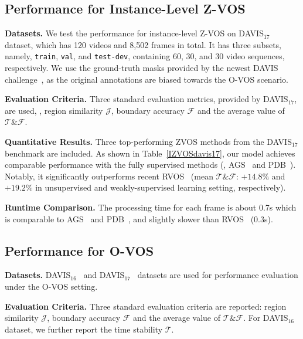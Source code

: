 \documentclass[10pt,twocolumn,letterpaper]{article}
\begin{document}
\vspace{-2pt}
\subsection{Performance for Instance-Level Z-VOS}
\label{sec:IZVOS}
\vspace{-1pt}
\noindent\textbf{Datasets.} We test the performance for instance-level Z-VOS on DAVIS$_{17}$~\!\cite{Caelles_arXiv_2019} dataset, which has 120 videos and 8,502 frames in total. It has three subsets, namely, \texttt{train},
\texttt{val}, and \texttt{test-dev}, containing 60, 30, and 30 video sequences, respectively. We use the ground-truth masks provided by the newest DAVIS challenge~\!\cite{Caelles_arXiv_2019}, as the original annotations are biased towards the O-VOS scenario.

\noindent\textbf{Evaluation Criteria.}
Three standard evaluation metrics, provided by DAVIS$_{17}$, are used, \ie, region similarity $\mathcal{J}$, boundary accuracy $\mathcal{F}$ and the average value of $\mathcal{T}\&\mathcal{F}$.

\noindent\textbf{Quantitative Results.} Three top-performing ZVOS methods from the DAVIS$_{17}$ benchmark are included. As shown in Table~\!\ref{IZVOSdavis17},  our model achieves comparable performance with the fully supervised methods (\ie, AGS~\!\cite{wang2019learning} and PDB~\!\cite{Song_2018_ECCV}). Notably, it significantly outperforms recent RVOS~\!\cite{ventura2019rvos}  (mean $\mathcal{T}\&\mathcal{F}$: $+14.8\%$ and $+19.2\%$ in unsupervised and weakly-supervised learning setting, respectively).



\noindent\textbf{Runtime Comparison.} The processing time for each frame is about 0.7s which is comparable to AGS~\!\cite{wang2019learning} and PDB~\!\cite{Song_2018_ECCV}, and slightly slower than RVOS~\cite{ventura2019rvos} (0.3s).

\vspace{-3pt}
\subsection{Performance for O-VOS}
\label{sec:OVOS}
\vspace{-3pt}
\noindent\textbf{Datasets.} DAVIS$_{16}$~\!\cite{perazzi2016benchmark} and DAVIS$_{17}$~\!\cite{pont20172017} datasets are used for performance evaluation under the O-VOS setting.

\noindent\textbf{Evaluation Criteria.}
Three standard evaluation criteria are reported: region similarity $\mathcal{J}$, boundary accuracy $\mathcal{F}$ and the average value of $\mathcal{T}\&\mathcal{F}$. For DAVIS$_{16}$ dataset, we further report the time stability $\mathcal{T}$.
\end{document}
